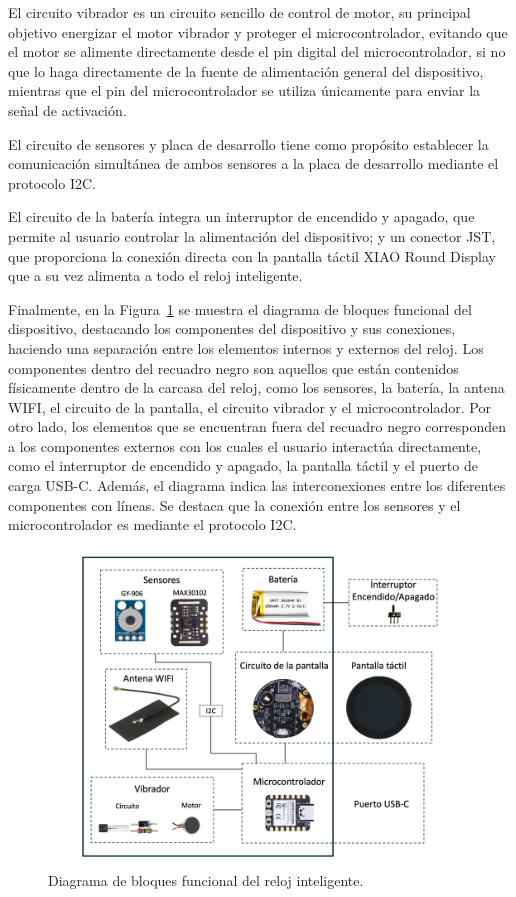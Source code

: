 \documentclass[
  12pt,
  letterpaper,
  DIV=11,
  numbers=noendperiod]{scrreport}
\begin{document}
El circuito vibrador es un circuito sencillo de control de motor, su
principal objetivo energizar el motor vibrador y proteger el
microcontrolador, evitando que el motor se alimente directamente desde
el pin digital del microcontrolador, si no que lo haga directamente de
la fuente de alimentación general del dispositivo, mientras que el pin
del microcontrolador se utiliza únicamente para enviar la señal de
activación.

El circuito de sensores y placa de desarrollo tiene como propósito
establecer la comunicación simultánea de ambos sensores a la placa de
desarrollo mediante el protocolo I2C.

El circuito de la batería integra un interruptor de encendido y apagado,
que permite al usuario controlar la alimentación del dispositivo; y un
conector JST, que proporciona la conexión directa con la pantalla táctil
XIAO Round Display que a su vez alimenta a todo el reloj inteligente.

Finalmente, en la Figura~\ref{fig-DiagramaBloques} se muestra el
diagrama de bloques funcional del dispositivo, destacando los
componentes del dispositivo y sus conexiones, haciendo una separación
entre los elementos internos y externos del reloj. Los componentes
dentro del recuadro negro son aquellos que están contenidos físicamente
dentro de la carcasa del reloj, como los sensores, la batería, la antena
WIFI, el circuito de la pantalla, el circuito vibrador y el
microcontrolador. Por otro lado, los elementos que se encuentran fuera
del recuadro negro corresponden a los componentes externos con los
cuales el usuario interactúa directamente, como el interruptor de
encendido y apagado, la pantalla táctil y el puerto de carga USB-C.
Además, el diagrama indica las interconexiones entre los diferentes
componentes con líneas. Se destaca que la conexión entre los sensores y
el microcontrolador es mediante el protocolo I2C.

\begin{figure}

{\centering \includegraphics{Capitulos/../Imagenes/DiagramaBloques.png}

}

\caption{\label{fig-DiagramaBloques}Diagrama de bloques funcional del
reloj inteligente.}

\end{figure}
\end{document}
